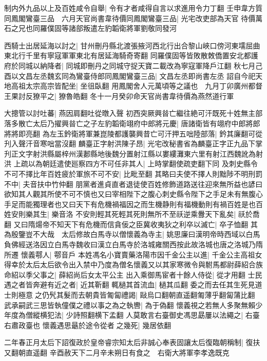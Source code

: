 制内外九品以上及百姓咸令自舉|{
	令有才者咸得自言以求進用令力丁翻}
壬申韋方質同鳳閣鸞臺三品　六月天官尚書韋待價同鳳閣鸞臺三品|{
	光宅改吏部為天官}
待價萬石之兄也同羅僕固等諸部叛遣左豹韜衛將軍劉敬同發河

西騎士出居延海以討之|{
	甘州刪丹縣北渡張掖河西北行出合黎山峽口傍河東壖屈曲東北行千里有寧寇軍軍東北有居延海騎奇寄翻}
同羅僕固等皆敗散敇僑置安北都護府於同城以納降者|{
	同城即刪丹之同城守捉天寶二載改為寧寇軍降戶江翻}
秋七月己酉以文昌左丞魏玄同為鸞臺侍郎同鳳閣鸞臺三品|{
	文昌左丞即尚書左丞}
詔自今祀天地高祖太宗高宗皆配坐|{
	坐徂臥翻}
用鳳閣舍人元萬頃等之議也　九月丁卯廣州都督王果討反獠平之|{
	獠魯皓翻}
冬十一月癸卯命天官尚書韋待價為燕然道行軍

大摠管以討吐蕃|{
	燕因肩翻吐從暾入聲}
初西突厥興㫺亡繼往絶可汗既死十姓無主部落多散亡太后乃擢興㫺亡之子左豹韜衛翊府中郎將元慶|{
	唐諸衛皆有翊府中郎將郎將將即亮翻}
為左玉鈐衛將軍兼崑陵都護襲興昔亡可汗押五咄陸部落|{
	鈐其廉翻可從刋入聲汗音寒咄當沒翻}
麟臺正字射洪陳子昂|{
	光宅改秘書省為麟臺正字正九品下掌刋正文字射洪縣屬梓州漢郪縣地後魏分置射江縣以婁縷灘東六里有射江西魏訛為射洪}
上疏以為朝廷遣使廵察四方不可任非其人|{
	上時掌翻使疏吏翻下同}
及刺史縣令不可不擇比年百姓疲於軍旅不可不安|{
	比毗至翻}
其略曰夫使不擇人則黜陟不明刑罰不中|{
	夫音扶中竹仲翻}
朋黨者進貞直者退徒使百姓修飾道路送往迎來無所益也諺曰欲知其人觀其所使不可不慎也又曰宰相陛下之腹心刺史縣令陛下之手足未有無腹心手足而能獨理者也又曰天下有危機禍福因之而生機静則有福機動則有禍百姓是也百姓安則樂其生|{
	樂音洛}
不安則輕其死輕其死則無所不至祅逆乘釁天下亂矣|{
	祅於喬翻}
又曰隋煬帝不知天下有危機而信貪佞之臣冀收夷狄之利卒以滅亡|{
	卒子恤翻}
其為殷鑒豈不大哉　太后修故白馬寺以僧懷義為寺主|{
	姚思廉曰漢明帝時西域以白馬負佛經送洛因立白馬寺魏收曰漢立白馬寺於洛城雍關西按此故洛城也唐之洛城乃隋所遷}
懷義鄠人|{
	鄠音戶}
本姓馮名小寶賣藥洛陽市因千金公主以進|{
	千金公主高祖女}
得幸於太后太后欲令出入禁中乃度為僧名懷義又以其家寒微令與駙馬都尉薛紹合族命紹以季父事之|{
	薛紹尚后女太平公主}
出入乘御馬宦者十餘人侍從|{
	從才用翻}
士民遇之者皆奔避有近之者|{
	近其靳翻}
輒檛其首流血|{
	檛其瓜翻}
委之而去任其生死見道士則極意之仍髠其髮而去朝貴皆匍匐禮謁|{
	敺烏口翻朝直遥翻匍薄乎翻匐蒲比翻}
武承嗣武三思皆執僮僕之禮以事之為之執轡|{
	為于偽翻}
懷義視之若無人多聚無賴少年度為僧縱横犯法|{
	少詩照翻横下孟翻}
人莫敢言右臺御史馮思勗屢以法繩之|{
	右臺右肅政臺也}
懷義遇思朂於途令從者之幾死|{
	幾居依翻}


二年春正月太后下詔復政於皇帝睿宗知太后非誠心奉表固讓太后復臨朝稱制|{
	復扶又翻朝直遥翻}
辛酉赦天下二月辛未朔日有食之　右衛大將軍李孝逸既克

